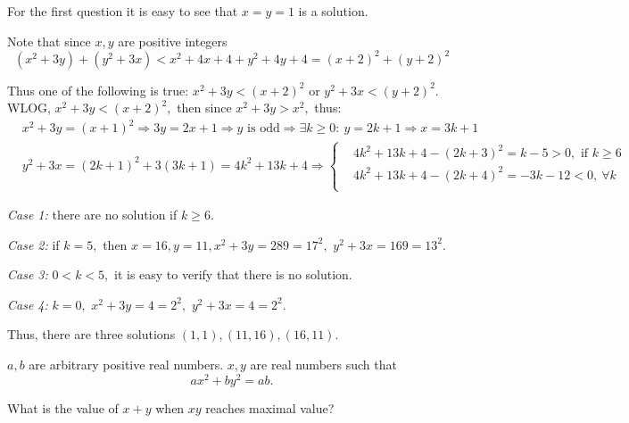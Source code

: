 \documentclass{article}
\begin{document}
\begin{soln}
    For the first question it is easy to see that $\boxed{x = y = 1}$ is a solution.

    Note that since $x, y$ are positive integers
    \[
        (x^2 + 3y) + (y^2 + 3x) < x^2 + 4x + 4 + y^2 + 4y + 4 = (x+2)^2 + (y+2)^2
    \]
    
    Thus one of the following is true: $x^2 + 3y < (x + 2)^2$ or $y^2 + 3x < (y+2)^2.$
    WLOG, $x^2 + 3y < (x + 2)^2,$ then since $x^2 + 3y > x^2,$ thus:
    \[
        \begin{aligned}
            &x^2 + 3y = (x+1)^2 \Rightarrow 3y = 2x+1 \Rightarrow y \text{\ is odd} \Rightarrow \exists k \ge 0:\ y = 2k+1 \Rightarrow x = 3k+1\\
            &y^2+3x = (2k+1)^2+3(3k+1) = 4k^2 + 13k + 4
            \Rightarrow
            \begin{cases}
                &4k^2 + 13k + 4 - (2k+3)^2 = k-5 > 0, \text{\ if\ } k\ge 6\\
                &4k^2 + 13k + 4 - (2k+4)^2 = -3k-12 < 0,\ \forall k\\
            \end{cases}
        \end{aligned}
    \]
    
    \textit{Case 1:} there are no solution if $k \ge 6.$

    \textit{Case 2:} if $k=5,$ then $x=16, y=11, x^2 + 3y = 289 = 17^2,$ $y^2+3x = 169=13^2.$

    \textit{Case 3:} $0< k < 5,$ it is easy to verify that there is no solution.

    \textit{Case 4:} $k = 0,$ $x^2 + 3y = 4 = 2^2,$ $y^2+3x = 4 = 2^2.$

    Thus, there are three solutions $\boxed{(1,1), (11, 16), (16, 11).}$
\end{soln}

\begin{problem}
    $a, b$ are arbitrary positive real numbers. $x, y$ are real numbers such that 
    \[
        ax^2 + by^2 = ab.
    \]

    What is the value of $x+y$ when $xy$ reaches maximal value?
\end{problem}
\end{document}
